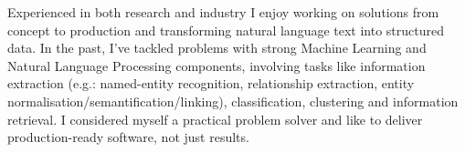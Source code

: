 

\begin{cvparagraph}

Experienced in both research and industry I enjoy working on solutions from concept to production and transforming natural language text into structured data. In the past, I've tackled problems with strong Machine Learning and Natural Language Processing components, involving tasks like information extraction (e.g.: named-entity recognition, relationship extraction, entity normalisation/semantification/linking), classification, clustering and information retrieval. I considered myself a practical problem solver and like to deliver production-ready software, not just results.
\end{cvparagraph}
